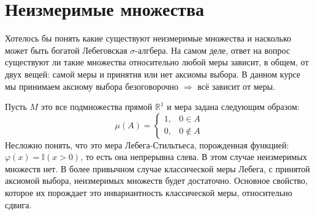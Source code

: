 \documentclass[12pt]{article}
\newcommand{\MR}{\mathbb{R}}
\newcommand{\MTI}{\mathbb{I}}
\theoremstyle{definition}
\begin{document}

\section*{Неизмеримые множества}

Хотелось бы понять какие существуют неизмеримые множества и насколько может быть богатой Лебеговская $\sigma$-алгбера. На самом деле, ответ на вопрос существуют ли такие множества относительно любой меры зависит, в общем, от двух вещей: самой меры и принятия или нет аксиомы выбора. В данном курсе мы принимаем аксиому выбора безоговорочно $\Rightarrow$ всё зависит от меры.

Пусть $M$ это все подмножества прямой $\MR^1$ и мера задана следующим образом:
$$
	\mu(A) = 
	\begin{cases}
		1, & 0 \in A \\
		0, & 0 \not\in A 
	\end{cases}
$$ 
Несложно понять, что это мера Лебега-Стильтьеса, порожденная функцией: $\varphi(x) = \MTI(x > 0)$, то есть она непрерывна слева. В этом случае неизмеримых множеств нет. В более привычном случае классической меры Лебега, с принятой аксиомой выбора, неизмеримых множеств будет достаточно. Основное свойство, которое их порождает это инвариантность классической меры, относительно сдвига.
\end{document}
